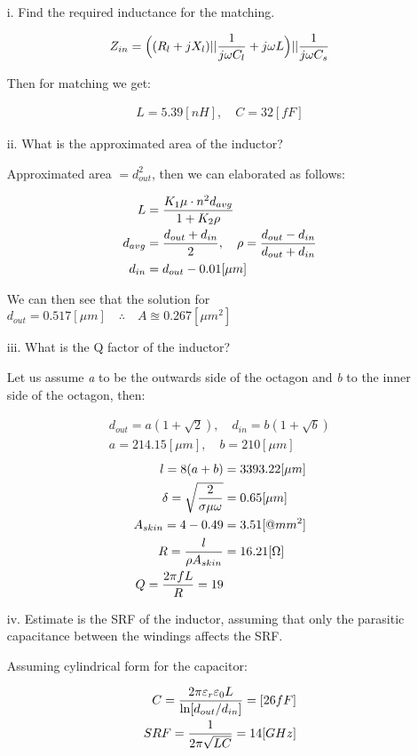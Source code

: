 \documentclass[12pt, letterpaper]{article}
\begin{document}
\begin{itemize}
  \item [i.] Find the required inductance for the matching.
  
  \begin{align}
    Z_{in}
    =
    \Bigl(
      (R_l+jX_l)
      ||{1\over j\omega C_l}+j\omega L
    \Bigr)||{1\over j\omega C_s}
  \end{align}

  {\color{blue}Then for matching we get: }

  \begin{align}
    L=5.39[nH], \quad C=32[fF]
  \end{align}

  \item [ii.] What is the approximated area of the inductor?

  {\color{blue}Approximated area $=d_{out}^2$, then we can elaborated as follows:}

  \begin{align}
    L&={K_1\mu \cdot n^2 d_{avg}\over 1+K_2\rho}
    \\
    d_{avg}&={d_{out}+d_{in}\over2}, \quad \rho={d_{out}-d_{in}\over d_{out}+d_{in}}
    \\
    d_{in}&=d_{out}-0.01[\mu m]
  \end{align}

  {\color{blue}We can then see that the solution for $d_{out}=0.517[\mu m]\quad\therefore \quad A\approxeq0.267[\mu m^2]$}

  \item [iii.] What is the Q factor of the inductor?

  {\color{blue}Let us assume \textit{a} to be the outwards side of the octagon and \textit{b} to the inner side of the octagon, then:}

  \begin{align}
    d_{out}=a(1+\sqrt{2}), \quad d_{in}=b(1+\sqrt{b})
    \\
    a=214.15[\mu m], \quad b=210[\mu m]
  \end{align}
  \begin{align}
    l=8(a+b)&=3393.22[\mu m]
    \\
    \delta=\sqrt{2\over\sigma\mu\omega}&=0.65[\mu m]
    \\
    A_{skin}=4-0.49&=3.51[@m m^2]
    \\
    R={l\over\rho A_{skin}}&=16.21[\Omega]
    \\
    Q={2\pi fL\over R}=19
  \end{align}

  \item [iv.] Estimate is the SRF of the inductor, assuming that only the parasitic capacitance between the windings affects the SRF.
  
  {\color{blue}Assuming cylindrical form for the capacitor:}

  \begin{align}
    C={2\pi\varepsilon_r\varepsilon_0L\over\ln[d_{out}/d_{in}]}=[26fF]
    \\
    SRF={1\over2\pi\sqrt{LC}}=14[GHz]
  \end{align}
\end{itemize}
\end{document}
